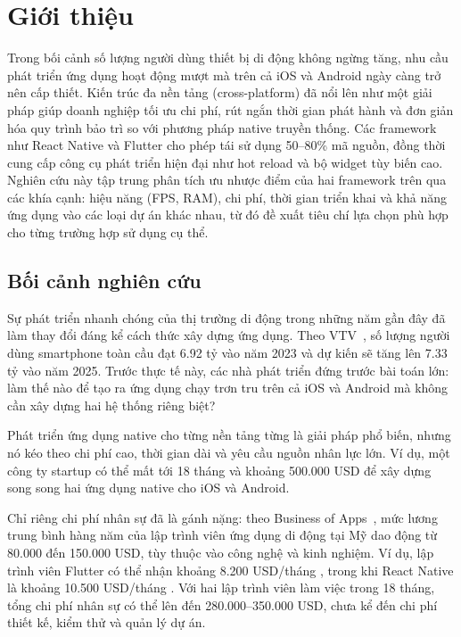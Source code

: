 \section{Giới thiệu}
  
    Trong bối cảnh số lượng người dùng thiết bị di động không ngừng tăng, nhu cầu phát triển ứng dụng hoạt động mượt mà trên cả iOS và Android ngày càng trở nên cấp thiết. Kiến trúc đa nền tảng (cross-platform) đã nổi lên như một giải pháp giúp doanh nghiệp tối ưu chi phí, rút ngắn thời gian phát hành và đơn giản hóa quy trình bảo trì so với phương pháp native truyền thống. Các framework như React Native và Flutter cho phép tái sử dụng 50--80\% mã nguồn, đồng thời cung cấp công cụ phát triển hiện đại như hot reload và bộ widget tùy biến cao. Nghiên cứu này tập trung phân tích ưu nhược điểm của hai framework trên qua các khía cạnh: hiệu năng (FPS, RAM), chi phí, thời gian triển khai và khả năng ứng dụng vào các loại dự án khác nhau, từ đó đề xuất tiêu chí lựa chọn phù hợp cho từng trường hợp sử dụng cụ thể.

\subsection{Bối cảnh nghiên cứu}
\renewcommand{\labelitemi}{--}    

    Sự phát triển nhanh chóng của thị trường di động trong những năm gần đây đã làm thay đổi đáng kể cách thức xây dựng ứng dụng. Theo VTV~\cite{statista2023}, số lượng người dùng smartphone toàn cầu đạt 6.92 tỷ vào năm 2023 và dự kiến sẽ tăng lên 7.33 tỷ vào năm 2025. Trước thực tế này, các nhà phát triển đứng trước bài toán lớn: làm thế nào để tạo ra ứng dụng chạy trơn tru trên cả iOS và Android mà không cần xây dựng hai hệ thống riêng biệt?
\vspace{0.5em}


    Phát triển ứng dụng native cho từng nền tảng từng là giải pháp phổ biến, nhưng nó kéo theo chi phí cao, thời gian dài và yêu cầu nguồn nhân lực lớn. Ví dụ, một công ty startup có thể mất tới 18 tháng và khoảng 500.000 USD để xây dựng song song hai ứng dụng native cho iOS và Android.
\vspace{0.5em}


    Chỉ riêng chi phí nhân sự đã là gánh nặng: theo Business of Apps~\cite{businessofapps2025}, mức lương trung bình hàng năm của lập trình viên ứng dụng di động tại Mỹ dao động từ 80.000 đến 150.000 USD, tùy thuộc vào công nghệ và kinh nghiệm. Ví dụ, lập trình viên Flutter có thể nhận khoảng 8.200 USD/tháng \cite{fluttersalary}, trong khi React Native là khoảng 10.500 USD/tháng \cite{reactnativesalary}. Với hai lập trình viên làm việc trong 18 tháng, tổng chi phí nhân sự có thể lên đến 280.000--350.000 USD, chưa kể đến chi phí thiết kế, kiểm thử và quản lý dự án.
\vspace{0.5em}



